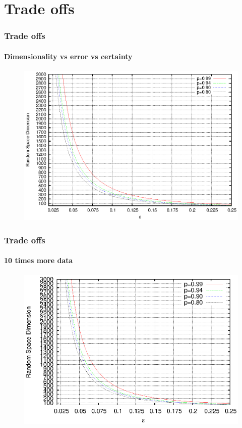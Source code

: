 \documentclass{beamer}
\begin{document}
\section{Trade offs}
\begin{frame}
\frametitle{Trade offs}
\framesubtitle{Dimensionality vs error vs certainty}
 		\begin{figure}
		\includegraphics[scale=0.88]{tradeoffs1.eps}
	\end{figure}
\end{frame} 

\begin{frame}
\frametitle{Trade offs}
\framesubtitle{10 times more data}
 		\begin{figure}
		\includegraphics[scale=0.88]{tradeoffs2.eps}
	\end{figure}
\end{frame} 
\end{document}
